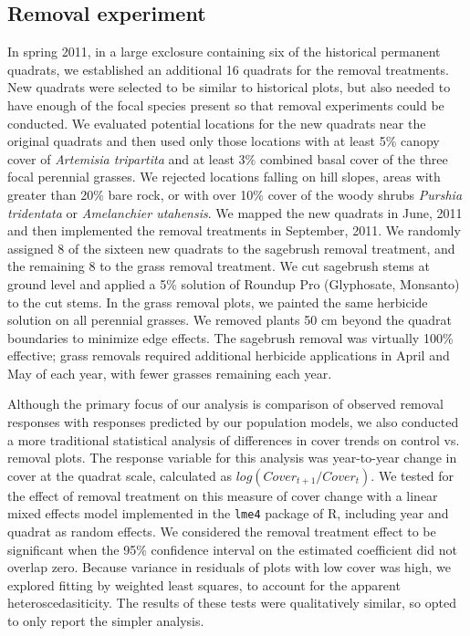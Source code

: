 \documentclass[11pt]{article}
\begin{document}
\begin{doublespacing}
\subsection*{Removal experiment}
In spring 2011, in a large exclosure containing six of the historical permanent quadrats, we established an additional 16 quadrats for the removal treatments. New quadrats were selected to be similar to historical plots, but also needed to have enough of the focal species present so that removal experiments could be conducted. We evaluated potential locations for the new quadrats near the original quadrats and then used only those locations with at least 5\% canopy cover of \textit{Artemisia tripartita} and at least 3\% combined basal cover of the three focal perennial grasses. We rejected locations falling on hill slopes, areas with greater than 20\% bare rock, or with over 10\% cover of the woody shrubs \textit{Purshia tridentata} or \textit{Amelanchier utahensis}. We mapped the new quadrats in June, 2011 and then implemented the removal treatments in September, 2011. We randomly assigned 8 of the sixteen new quadrats to the sagebrush removal treatment, and the remaining 8 to the grass removal treatment. We cut sagebrush stems at ground level and applied a 5\% solution of Roundup Pro (Glyphosate, Monsanto) to the cut stems. In the grass removal plots, we painted the same herbicide solution on all perennial grasses. We removed plants 50 cm beyond the quadrat boundaries to minimize edge effects. The sagebrush removal was virtually 100\% effective; grass removals required additional herbicide applications in April and May of each year, with fewer grasses remaining each year.

Although the primary focus of our analysis is comparison of observed removal responses with responses predicted by our population models, we also conducted a more traditional statistical analysis of differences in cover trends on control vs. removal plots. The response variable for this analysis was year-to-year change in cover at the quadrat scale, calculated as $log(Cover_{t+1}/Cover_t)$. We tested for the effect of removal treatment on this measure of cover change with a linear mixed effects model implemented in the \texttt{lme4} package \citep{Bates2015} of R, including year and quadrat as random effects. We considered the removal treatment effect to be significant when the 95\% confidence interval on the estimated coefficient did not overlap zero.  Because variance in residuals of plots with low cover was high, we explored fitting by weighted least squares, to account for the apparent heteroscedasiticity. The results of these tests were qualitatively similar, so opted to only report the simpler analysis.



\end{doublespacing}
\end{document}
